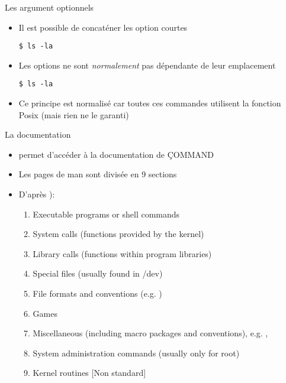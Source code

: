 \begin{frame}[fragile=singleslide]{Les argument optionnels}
  \begin{itemize}
  \item Il est possible de concaténer les option courtes
    \begin{lstlisting}
$ ls -la
    \end{lstlisting} %
  \item Les options ne  sont \emph{normalement} pas dépendante de leur
    emplacement
    \begin{lstlisting}
$ ls -la
    \end{lstlisting} %
  \item Ce  principe est normalisé car toutes  ces commandes utilisent
    la fonction Posix  (mais rien ne le garanti)
  \end{itemize}
\end{frame}



\begin{frame}[fragile=singleslide]{La documentation}
  \begin{itemize}
  \item  {} permet  d'accéder  à  la documentation  de
    \c{COMMAND}
  \item  Les  pages  de  man  sont  divisée  en  9  sections
  \item D'après ):
    \begin{enumerate}
    \item Executable programs or shell commands
    \item System calls (functions provided by the kernel)
    \item Library calls (functions within program libraries)
    \item Special files (usually found in /dev)
    \item File formats and conventions (e.g. )
    \item Games
    \item  Miscellaneous (including  macro packages  and conventions),
      e.g.  , 
    \item System administration commands (usually only for root)
    \item Kernel routines [Non standard]
    \end{enumerate}
  \end{itemize}
\end{frame}

